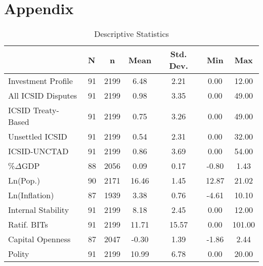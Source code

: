 \documentclass[12pt,onesided]{amsart}
\begin{document}
\newpage





\processdelayedfloats 

\newpage

\section*{Appendix}
\label{appendix}

\appendix
\setcounter{figure}{0} \renewcommand{\thefigure}{A.\arabic{figure}}
\setcounter{table}{0} \renewcommand{\thetable}{A.\arabic{table}}

\begin{table}[ht]
\centering
\caption{Descriptive Statistics}
\label{tab:descStats}
\begin{tabular}{llccccc}
	  \hline\hline
	  & N & n & Mean & Std. Dev. & Min & Max \\ 
	  \hline
	Investment Profile & 91 & 2199 & 6.48 & 2.21 & 0.00 & 12.00 \\ 
	  All ICSID Disputes & 91 & 2199 & 0.98 & 3.35 & 0.00 & 49.00 \\ 
	  ICSID Treaty-Based & 91 & 2199 & 0.75 & 3.26 & 0.00 & 49.00 \\ 
	  Unsettled ICSID & 91 & 2199 & 0.54 & 2.31 & 0.00 & 32.00 \\ 
	  ICSID-UNCTAD & 91 & 2199 & 0.86 & 3.69 & 0.00 & 54.00 \\ 
	  \%$\Delta$GDP & 88 & 2056 & 0.09 & 0.17 & -0.80 & 1.43 \\ 
	  Ln(Pop.) & 90 & 2171 & 16.46 & 1.45 & 12.87 & 21.02 \\ 
	  Ln(Inflation) & 87 & 1939 & 3.38 & 0.76 & -4.61 & 10.10 \\ 
	  Internal Stability & 91 & 2199 & 8.18 & 2.45 & 0.00 & 12.00 \\ 
	  Ratif. BITs & 91 & 2199 & 11.71 & 15.57 & 0.00 & 101.00 \\ 
	  Capital Openness & 87 & 2047 & -0.30 & 1.39 & -1.86 & 2.44 \\ 
	  Polity & 91 & 2199 & 10.99 & 6.78 & 0.00 & 20.00 \\ 
	   \hline\hline
\end{tabular}
\end{table}

\end{document}
